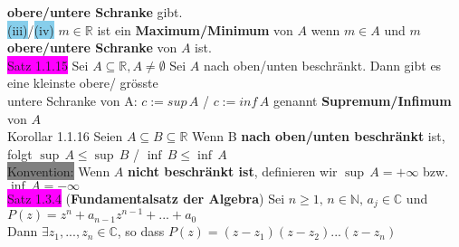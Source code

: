 \documentclass[10pt]{article}
\newcommand{\R}{\mathbb{R}}
\begin{document}
                \textbf{obere/untere Schranke} gibt. \\
        \indent \colorbox{SkyBlue}{(iii)}/\colorbox{SkyBlue}{(iv)} $m\in\R$ ist ein 
                \textbf{Maximum/Minimum} von $A$ wenn $m\in A$ und 
                $m$ \textbf{obere/untere Schranke} von $A$ ist. \\
\colorbox{magenta}{Satz 1.1.15}  Sei $A\subseteq\R, A\neq\emptyset$ Sei $A$ 
                nach oben/unten beschränkt. 
                Dann gibt es eine kleinste obere/ grösste \\
        \indent untere Schranke von A: \quad \textcolor{NavyBlue}{
                $c:=sup\,A$ / $c:=inf\,A$}  genannt 
                \textbf{Supremum/Infimum} von $A$ \\
\colorbox{BurntOrange}{Korollar 1.1.16} Seien \textcolor{NavyBlue}{
                $A\subseteq B\subseteq\R$} Wenn B \textbf{nach oben/unten 
                beschränkt} ist, folgt \textcolor{NavyBlue}{
                $\sup\,A\leqslant \sup\,B$ / $\inf\,B\leqslant \inf\,A$} \\
\colorbox{gray}{Konvention:} Wenn $A$ \textbf{nicht beschränkt ist}, definieren wir 
                 \textcolor{NavyBlue}{$\sup\,A=+\infty$} bzw. 
                 \textcolor{NavyBlue}{$\inf\,A=-\infty$}\\
\colorbox{magenta}{Satz 1.3.4} (\textbf{Fundamentalsatz der Algebra}) Sei 
                $n\geqslant 1,\,n\in\mathbb{N},\,a_j\in\mathbb{C}$ und 
                \textcolor{NavyBlue}{$P(z)=z^n+a_{n-1}z^{n-1}+...+a_0$}\\
        \indent Dann \textcolor{NavyBlue}{$\exists z_1,...,z_n\in\mathbb{C}$}, so dass 
                \textcolor{NavyBlue}{$P(z)=(z-z_1)(z-z_2)...(z-z_n)$}
\end{document}
